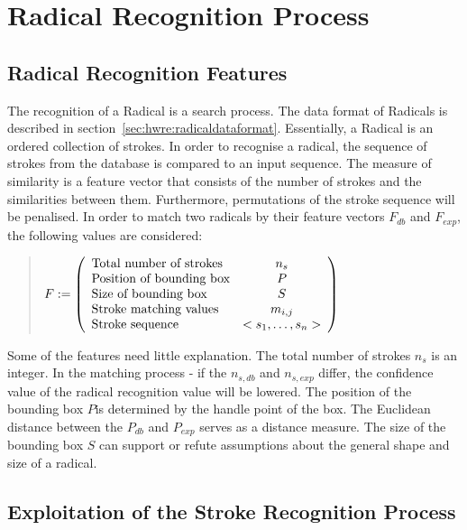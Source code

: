 \section{Radical Recognition Process}
\label{sec:hwre:radicalrecognitionprocess}

\subsection{Radical Recognition Features}
\label{sec:hwre:radicalrecognitionfeatures}

The recognition of a Radical is a search process. The data format of Radicals is 
described in section~\ref{sec:hwre:radicaldataformat}.
Essentially, a Radical is an ordered collection of strokes.
In order to recognise a radical, the sequence of strokes from the database
is compared to an input sequence.
The measure of similarity is a feature vector that consists of the number of
strokes and the similarities between them.
Furthermore, permutations of the stroke sequence will be penalised.
In order to match two radicals by their feature vectors \(F_{db} \) 
and \(F_{exp} \), the following values are considered:
\begin{quote}
\(
    F :=
    \left( 
    \begin {array} {l c} 
        \text{Total number of strokes} & n_{s} \\
        \text{Position of bounding box} & P \\
        \text{Size of bounding box} & S \\
        \text{Stroke matching values} & m_{i,j} \\ 
        \text{Stroke sequence} & <s_1,\ldots,s_n> \\
    \end {array} 
    \right)
\)
\end{quote}
Some of the features need little explanation. The total number of strokes 
\( n_{s} \) is an integer. In the matching process - if the \(n_{s,db} \) and
\(n_{s,exp} \) differ, the confidence value of the radical recognition value 
will be lowered. The position of the bounding box \(P\)is determined by the 
handle point of the box. The Euclidean distance between the \(P_{db}\) and 
\(P_{exp}\) serves as a distance measure. The size of the bounding box \(S\) 
can support or refute assumptions about the general shape and size of a radical.

\subsection[Exploitation of Stroke Recognition]
{Exploitation of the Stroke Recognition Process}
\label{sec:hwre:exploitationofstrokerecogition}

